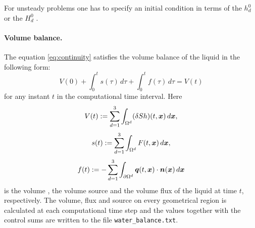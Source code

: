 For unsteady problems one has to specify an initial condition in terms of the 
$h_d^0$ 
or the 
$H_d^0$ .

\paragraph{Volume balance.}
The equation \eqref{eq:continuity} satisfies the volume balance of the liquid in the following form:
\[ V(0) + \int_0^t s(\tau) \,d\tau + \int_0^t f(\tau) \,d\tau = V(t) \]
for any instant $t$ in the computational time interval.
Here
$$ V(t) := \sum_{d=1}^3\int_{\Omega^d}(\delta S h)(t,\mathbf{\boldsymbol{x}})\,d\mathbf{\boldsymbol{x}}, $$
$$ s(t) := \sum_{d=1}^3\int_{\Omega^d}F(t,\mathbf{\boldsymbol{x}})\,d\mathbf{\boldsymbol{x}}, $$
$$ f(t) := -\sum_{d=1}^3\int_{\partial\Omega^d}\mathbf{\boldsymbol{q}}(t,\mathbf{\boldsymbol{x}})\cdot\mathbf{\boldsymbol{n}}(\mathbf{\boldsymbol{x}}) \,d\mathbf{\boldsymbol{x}} $$
is the volume , the volume source  and the volume flux  of the liquid at time $t$, respectively.
The volume, flux and source on every geometrical region is calculated at each computational time step and the values together with the control sums are written to the file \texttt{water\_balance.txt}.




